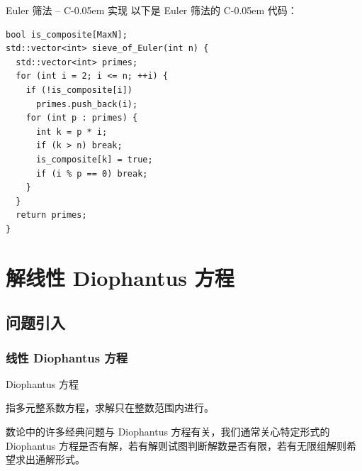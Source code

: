 \documentclass{../pkslide}
\newcommand{\Cpp}{\texorpdfstring{C\kern-0.05em\protect\raisebox{.35ex}{\textsmaller[2]{+\kern-0.05em+}}}{C++}}
\begin{document}
\begin{frame}[fragile]{Euler 筛法 -- \Cpp{} 实现}
  以下是 Euler 筛法的 \Cpp{} 代码：
  
\begin{verbatim}
bool is_composite[MaxN];
std::vector<int> sieve_of_Euler(int n) {
  std::vector<int> primes;
  for (int i = 2; i <= n; ++i) {
    if (!is_composite[i])
      primes.push_back(i);
    for (int p : primes) {
      int k = p * i;
      if (k > n) break;
      is_composite[k] = true;
      if (i % p == 0) break;
    }
  }
  return primes;
}
\end{verbatim}
\end{frame}


\section{解线性 Diophantus 方程}
\subsection{问题引入}
\subsubsection{线性 Diophantus 方程}


\begin{frame}{Diophantus 方程}
  \begin{definition}
    指多元整系数方程，求解只在整数范围内进行。
  \end{definition}
  
  数论中的许多经典问题与 Diophantus 方程有关，我们通常关心特定形式的 Diophantus 方程是否有解，若有解则试图判断解数是否有限，若有无限组解则希望求出通解形式。
\end{frame}
\end{document}
